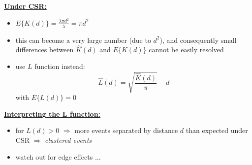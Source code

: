 \documentclass[portrait]{seminar}
\begin{document}
%
%
\begin{slide*}
\begin{center}
 \vspace*{-0.5cm} 
\end{center}

\vspace{0.5cm} \underline{\textbf{Under CSR:}}
\begin{itemize}
\item $E\{ K(d) \} = \frac{ \lambda \pi d^2 }{\lambda} = \pi d^2$
\item this can become a very large number (due to $d^2$),
and consequently small differences between $\hat{K}(d)$ and $E\{
K(d) \}$ cannot be easily resolved
\item use $L$ function instead:
\[
\hat{L}(d) = \sqrt{ \frac{\hat{K}(d)}{\pi} } - d
\]
with $E\{ L(d) \} =0$
\end{itemize}

\vspace{0.5cm} \underline{\textbf{Interpreting the L function:}}
\begin{itemize}
\item for $\hat{L}(d) > 0$ $\Rightarrow$ more events
separated by distance $d$ than expected under CSR $\Rightarrow$ {\em
clustered events}
\item watch out for edge effects $\ldots$
\end{itemize}

\end{slide*}
\end{document}
